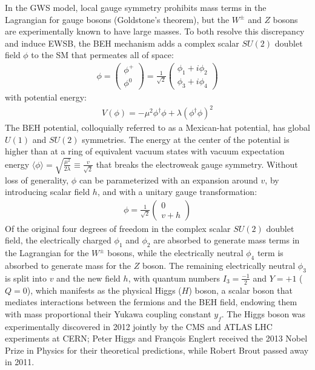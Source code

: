 In the GWS model, local gauge symmetry prohibits mass terms in the Lagrangian for gauge bosons (Goldstone's theorem), but the $W^\pm$ and $Z$ bosons are experimentally known to have large masses.
To both resolve this discrepancy and induce EWSB, the BEH mechanism adds a complex scalar $SU(2)$ doublet field $\phi$ to the SM that permeates all of space:
\begin{align}
\phi=\left(\begin{array}{l}
\phi^{+} \\
\phi^0
\end{array}\right)=\frac{1}{\sqrt{2}}\left(\begin{array}{l}
\phi_1+i \phi_2 \\
\phi_3+i \phi_4
\end{array}\right)
\end{align}
with potential energy:
\begin{align}
V(\phi) = -\mu^2 \phi^{\dagger} \phi + \lambda\left(\phi^{\dagger} \phi\right)^2
\end{align}
The BEH potential, colloquially referred to as a Mexican-hat potential, has global $U(1)$ and $SU(2)$ symmetries.
The energy at the center of the potential is higher than at a ring of equivalent vacuum states with vacuum expectation energy $\langle\phi\rangle=\sqrt{\frac{\mu^2}{2 \lambda}} \equiv \frac{v}{\sqrt{2}}$ that breaks the electroweak gauge symmetry.
Without loss of generality, $\phi$ can be parameterized with an expansion around $v$, by introducing scalar field $h$, and with a unitary gauge transformation:
\begin{align}
\phi=\frac{1}{\sqrt{2}}\left(\begin{array}{c}
0 \\
v+h
\end{array}\right)
\end{align}
Of the original four degrees of freedom in the complex scalar $SU(2)$ doublet field, the electrically charged $\phi_1$ and $\phi_2$ are absorbed to generate mass terms in the Lagrangian for the $W^\pm$ bosons, while the electrically neutral $\phi_4$ term is absorbed to generate mass for the $Z$ boson.
The remaining electrically neutral $\phi_3$ is split into $v$ and the new field $h$, with quantum numbers $I_3 = \frac{-1}{2}$ and $Y = +1$ ($Q = 0$), which manifests as the physical Higgs ($H$) boson, a scalar boson that mediates interactions between the fermions and the BEH field, endowing them with mass proportional their Yukawa coupling constant $y_f$.
The Higgs boson was experimentally discovered in 2012 jointly by the CMS and ATLAS LHC experiments at CERN; Peter Higgs and François Englert received the 2013 Nobel Prize in Physics for their theoretical predictions, while Robert Brout passed away in 2011.

